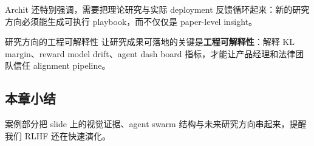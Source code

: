 Archit 还特别强调，需要把理论研究与实际 deployment 反馈循环起来：新的研究方向必须能生成可执行 playbook，而不仅仅是 paper-level insight。

\begin{knowledgebox}{研究方向的工程可解释性}
让研究成果可落地的关键是\textbf{工程可解释性}：解释 KL margin、reward model drift、agent dash board 指标，才能让产品经理和法律团队信任 alignment pipeline。
\end{knowledgebox}

\subsection{本章小结}

案例部分把 slide 上的视觉证据、agent swarm 结构与未来研究方向串起来，提醒我们 RLHF 还在快速演化。

